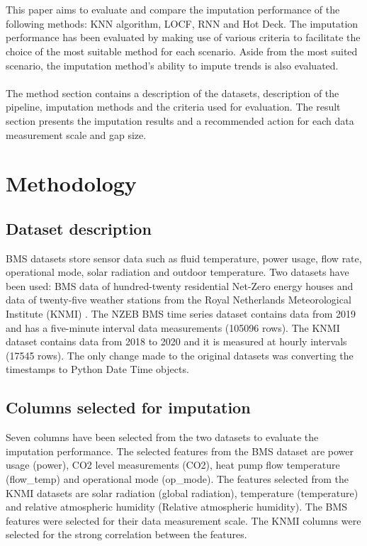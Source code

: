 \documentclass[9.5pt,article,twocolumn]{article}
\begin{document}
\\
\\
This paper aims to evaluate and compare the imputation performance of the following methods: KNN algorithm, LOCF, RNN and Hot Deck. The imputation performance has been evaluated by making use of various criteria to facilitate the choice of the most suitable method for each scenario. Aside from the most suited scenario, the imputation method’s ability to impute trends is also evaluated. 
\\
\\
The method section contains a description of the datasets, description of the pipeline, imputation methods and the criteria used for evaluation. The result section presents the imputation results and a recommended action for each data measurement scale and gap size. 

\section{Methodology}

\subsection{Dataset description}
BMS datasets store sensor data such as fluid temperature, power usage, flow rate, operational mode, solar radiation and outdoor temperature. Two datasets have been used: BMS data of hundred-twenty residential Net-Zero energy houses and data of twenty-five weather stations from the Royal Netherlands Meteorological Institute (KNMI) \cite{KNMI}. The NZEB BMS time series dataset contains data from 2019 and has a five-minute interval data measurements (105096 rows). The KNMI dataset contains data from 2018 to 2020 and it is measured at hourly intervals (17545 rows). The only change made to the original datasets was converting the timestamps to Python Date Time objects.

\subsection{Columns selected for imputation}
Seven columns have been selected from the two datasets to evaluate the imputation performance. The selected features from the BMS dataset are power usage (power), CO2 level measurements (CO2), heat pump flow temperature (flow\_temp) and operational mode (op\_mode). The features selected from the KNMI datasets are solar radiation (global radiation), temperature (temperature) and relative atmospheric humidity (Relative atmospheric humidity). The BMS features were selected for their data measurement scale. The KNMI columns were selected for the strong correlation between the features. 
\end{document}
